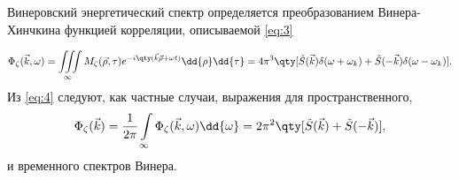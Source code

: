 Винеровский энергетический спектр определяется преобразованием Винера-Хинчкина функцией корреляции, описываемой \eqref{eq:3}

\begin{gather}
	\label{eq:4}
	\Phi_{\zeta}(\vec k ,\omega)= \iiint\limits_{\infty} 
	M_{\zeta}(\vec \rho, \tau) e^{-i\qty(\vec k \vec \rho + \omega t)} \dd{\rho} \dd{\tau}=4\pi^3 \qty[\tilde S(\vec k) \delta(\omega+\omega_k)+\tilde S(- \vec k) \delta(\omega- \omega_k)].
\end{gather}
Из \eqref{eq:4} следуют, как частные случаи, выражения для пространственного,
\begin{equation}
	\Phi_{\zeta}(\vec k)=\frac{1}{2\pi} \int\limits_{\infty} \Phi_{\zeta}(\vec k, \omega) \dd{\omega}= 2 \pi^2 \qty[\tilde S(\vec k)+\tilde S(-\vec k)],
\end{equation}
и временного спектров Винера.

{\color{red}{Разобрать фундаментально всю  теорию до этого момента.}}